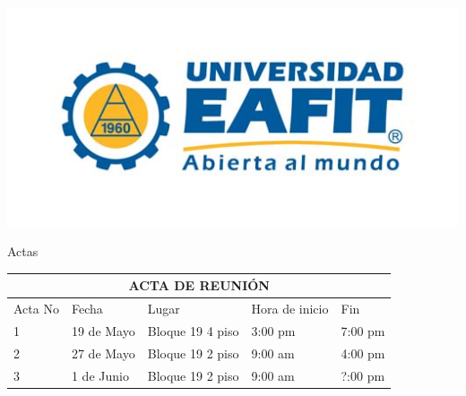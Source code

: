 \documentclass{article}
\begin{document}
    \begin{minipage}{0.4\textwidth}
        \includegraphics[scale=1]{Logo}
    \end{minipage}

    \begin{center}
        \begin{huge}
            Actas
        \end{huge}
    \end{center}

    \vspace{1cm}

    \begin{tabularx}{\textwidth}{ |X|X|X|X|X| }
        \hline
        \multicolumn{5}{|c|}{\cellcolor{blue} ACTA DE REUNI\'ON} \\
        \hline
        Acta No & Fecha & Lugar & Hora de inicio & Fin \\
        \hline
        1 & 19 de Mayo & Bloque 19 4 piso & 3:00 pm & 7:00 pm \\
        \hline
        2 & 27 de Mayo & Bloque 19 2 piso & 9:00 am & 4:00 pm \\
        \hline
        3 & 1 de Junio & Bloque 19 2 piso & 9:00 am & ?:00 pm \\
        \hline
    \end{tabularx}

    \vspace{1cm}
\end{document}
